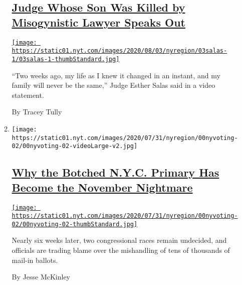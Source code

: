 \begin{enumerate}
\begin{enumerate}
    \hypertarget{judge-whose-son-was-killed-by-misogynistic-lawyer-speaks-out}{%
    \subsection{\texorpdfstring{\href{/2020/08/03/nyregion/esther-salas-roy-den-hollander.html}{Judge
    Whose Son Was Killed by Misogynistic Lawyer Speaks
    Out}}{Judge Whose Son Was Killed by Misogynistic Lawyer Speaks Out}}\label{judge-whose-son-was-killed-by-misogynistic-lawyer-speaks-out}}

    \href{/2020/08/03/nyregion/esther-salas-roy-den-hollander.html}{\texttt{[image: https://static01.nyt.com/images/2020/08/03/nyregion/03salas-1/03salas-1-thumbStandard.jpg]}}

    ``Two weeks ago, my life as I knew it changed in an instant, and my
    family will never be the same,'' Judge Esther Salas said in a video
    statement.

    By Tracey Tully
  \item
    \texttt{[image: https://static01.nyt.com/images/2020/07/31/nyregion/00nyvoting-02/00nyvoting-02-videoLarge-v2.jpg]}

    \hypertarget{why-the-botched-nyc-primary-has-become-the-november-nightmare}{%
    \subsection{\texorpdfstring{\href{/2020/08/03/nyregion/nyc-mail-ballots-voting.html}{Why
    the Botched N.Y.C. Primary Has Become the November
    Nightmare}}{Why the Botched N.Y.C. Primary Has Become the November Nightmare}}\label{why-the-botched-nyc-primary-has-become-the-november-nightmare}}

    \href{/2020/08/03/nyregion/nyc-mail-ballots-voting.html}{\texttt{[image: https://static01.nyt.com/images/2020/07/31/nyregion/00nyvoting-02/00nyvoting-02-thumbStandard.jpg]}}

    Nearly six weeks later, two congressional races remain undecided,
    and officials are trading blame over the mishandling of tens of
    thousands of mail-in ballots.

    By Jesse McKinley
  \end{enumerate}
\end{enumerate}


